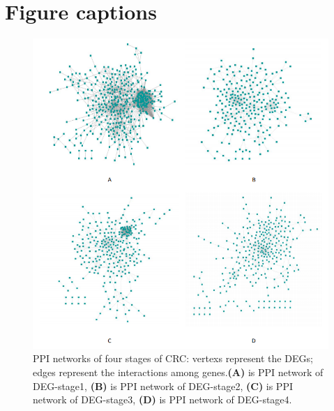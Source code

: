 \documentclass[utf8]{frontiersSCNS} %
\begin{document}
\section*{Figure captions}
\begin{figure}[h]
	\begin{center}
		\includegraphics[width=0.98\linewidth,height=0.6\textheight]{FIG/PPI}
	\end{center}
	\caption{ PPI networks of four stages of CRC: vertexs represent the DEGs; edges represent the interactions among genes.\textbf{(A)} is PPI network of DEG-stage1, \textbf{(B)} is PPI network of DEG-stage2, \textbf{(C)} is PPI network of DEG-stage3, \textbf{(D)} is PPI network of DEG-stage4. }\label{PPI}
\end{figure}
\end{document}
